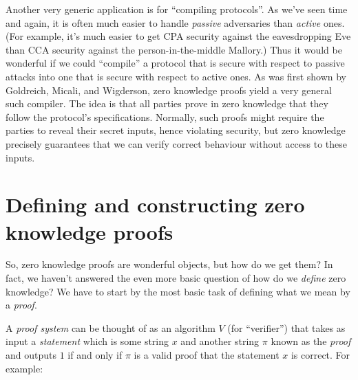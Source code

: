 Another very generic application is for ``compiling protocols''. As
we've seen time and again, it is often much easier to handle
\emph{passive} adversaries than \emph{active} ones. (For example, it's
much easier to get CPA security against the eavesdropping Eve than CCA
security against the person-in-the-middle Mallory.) Thus it would be
wonderful if we could ``compile'' a protocol that is secure with respect
to passive attacks into one that is secure with respect to active ones.
As was first shown by Goldreich, Micali, and Wigderson, zero knowledge
proofs yield a very general such compiler. The idea is that all parties
prove in zero knowledge that they follow the protocol's specifications.
Normally, such proofs might require the parties to reveal their secret
inputs, hence violating security, but zero knowledge precisely
guarantees that we can verify correct behaviour without access to these
inputs.

\section{Defining and constructing zero knowledge
proofs}\label{13-Defining-and-construct}

So, zero knowledge proofs are wonderful objects, but how do we get them?
In fact, we haven't answered the even more basic question of how do we
\emph{define} zero knowledge? We have to start by the most basic task of
defining what we mean by a \emph{proof}.

A \emph{proof system} can be thought of as an algorithm \(V\) (for
``verifier'') that takes as input a \emph{statement} which is some
string \(x\) and another string \(\pi\) known as the \emph{proof} and
outputs \(1\) if and only if \(\pi\) is a valid proof that the statement
\(x\) is correct. For example:

